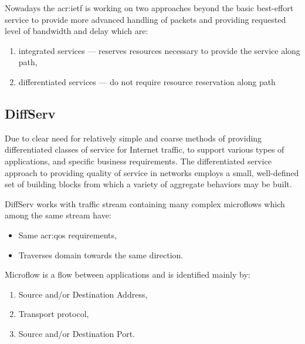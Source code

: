 \documentclass[11pt]{book}
\begin{document}

      Nowadays the \gls{acr:ietf} is working on two approaches beyond the basic best-effort service to provide more
      advanced handling of packets and providing requested level of bandwidth and delay which are:

      \begin{enumerate}
        \item integrated services --- reserves resources necessary to provide the service along path,
        \item differentiated services --- do not require resource reservation along path
      \end{enumerate}


      \subsection{DiffServ}

        Due to clear need for relatively simple and coarse methods of providing differentiated classes of service for
        Internet traffic, to support various types of applications, and specific business requirements. The
        differentiated service approach to providing quality of service in networks employs a small, well-defined set of
        building blocks from which a variety of aggregate behaviors may be built. \cite{qos}

        DiffServ works with traffic stream containing many complex microflows which among the same stream have:

        \begin{itemize}
          \item Same \gls{acr:qos} requirements,
          \item Traverses domain towards the same direction.
        \end{itemize}

        Microflow is a flow between applications and is identified mainly by:

        \begin{enumerate}
          \item Source and/or Destination Address,
          \item Transport protocol,
          \item Source and/or Destination Port.
        \end{enumerate}
\end{document}
